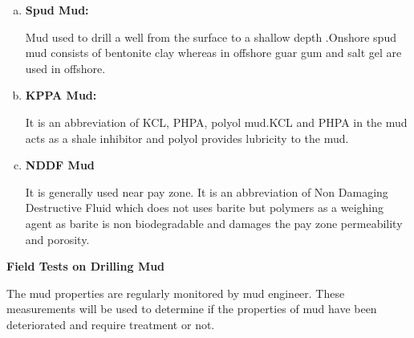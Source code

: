 \begin{enumerate}[(a)]

\item \textbf{Spud Mud:}

Mud used to drill a well from the surface to a shallow depth .Onshore spud mud
consists of bentonite clay whereas in offshore guar gum and salt gel are used 
in offshore.

\item \textbf{KPPA Mud:}

It is an abbreviation of KCL, PHPA, polyol mud.KCL and PHPA in the mud acts as 
a shale inhibitor and polyol provides lubricity to the mud.

\item \textbf{NDDF Mud}

It is generally used near pay zone. It is an abbreviation of Non Damaging 
Destructive Fluid which does not uses barite but polymers as a weighing agent as 
barite is non biodegradable and damages the pay zone permeability and porosity.
\end{enumerate}


\noindent \textbf{Field Tests on Drilling Mud}

The mud properties are regularly monitored by mud engineer. These measurements 
will be used to determine if the properties of mud have been deteriorated and 
require treatment or not.

